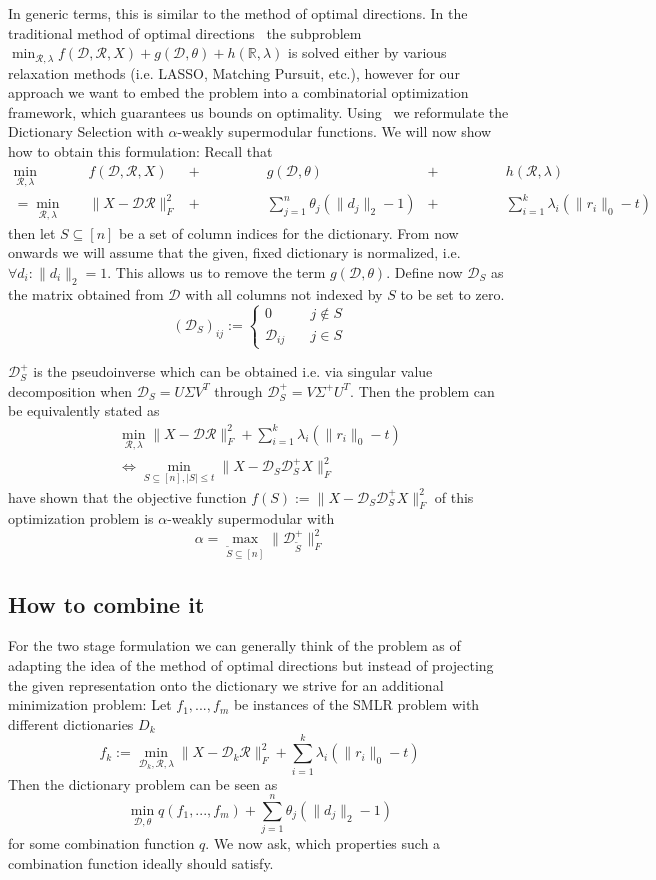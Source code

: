 \documentclass{article}
\newcommand{\R}{\mathbb{R}}
\newcommand{\Rr}{\mathcal{R}}
\newcommand{\D}{\mathcal{D}}
\begin{document}
\noindent In generic terms, this is similar to the method of optimal directions. In the traditional method of optimal directions~\cite{MOD} the subproblem $\min_{\Rr, \lambda} f(\D, \Rr, X) + g(\D, \theta) + h(\R, \lambda)$ is solved either by various relaxation methods (i.e. LASSO, Matching Pursuit, etc.), however for our approach we want to embed the problem into a combinatorial optimization framework, which guarantees us bounds on optimality. Using~\cite{weaklyalpha} we reformulate the Dictionary Selection with $\alpha$-weakly supermodular functions. We will now show how to obtain this formulation:
Recall that
\begin{align*}
\min_{\Rr, \lambda}\quad &f(\D, \Rr, X) &+& \qquad\qquad g(\D, \theta) &+& \qquad\qquad h(\Rr, \lambda) \\
= \min_{\Rr, \lambda}\quad &\|X -\D \Rr\|_F^2 &+& \qquad\qquad\sum_{j=1}^n \theta_j (\| d_j\|_2 - 1) &+& \qquad\qquad\sum_{i=1}^k \lambda_i (\| r_i \|_0 - t)
\end{align*}
then let $S \subseteq [n]$ be a set of column indices for the dictionary. From now onwards we will assume that the given, fixed dictionary is normalized, i.e. $\forall d_i: \|d_i \|_2 = 1$. This allows us to remove the term $g(\D, \theta)$. Define now $\D_S$ as the matrix obtained from $\D$ with all columns not indexed by $S$ to be set to zero.
\[
(\D_S)_{ij} := \begin{cases}
0 \quad &j \notin S \\
\D_{ij} \quad &j\in S
\end{cases}
\]

\noindent$\D_S^+$ is the pseudoinverse which can be obtained i.e. via singular value decomposition when $\D_S = U\Sigma V^T$ through $\D_S^+ = V \Sigma^+ U^T$.
Then the problem can be equivalently stated as
\[
\begin{split}
 \min_{\Rr, \lambda} \|X  -\D \Rr\|_F^2 + \sum_{i=1}^k \lambda_i (\| r_i \|_0 - t)\\
 \Longleftrightarrow 
  \min_{S \subseteq [n], |S| \leq t} \|X  -\D_S\D_S^+ X\|_F^2
 \end{split}
\]
\cite{weaklyalpha} have shown that the objective function $f(S) := \|X  -\D_S\D_S^+ X\|_F^2$ of this optimization problem is $\alpha$-weakly supermodular with 
\[ 
\alpha = \max_{\tilde{S} \subseteq [n]}\| \D_{\tilde{S}}^+ \|_F^2
\]

\subsection{How to combine it}
For the two stage formulation we can generally think of the problem as of adapting the idea of the method of optimal directions but instead of projecting the given representation onto the dictionary we strive for an additional minimization problem:
Let $f_1, ..., f_m$ be instances of the SMLR problem with different dictionaries $D_k$
\[
f_k := \min_{\D_k, \Rr, \lambda} \|X  -\D_k \Rr\|_F^2 + \sum_{i=1}^k \lambda_i (\| r_i \|_0 - t)
\]
 Then the dictionary problem can be seen as
\[
\min_{\D, \theta} q(f_1, ..., f_m) + \sum_{j=1}^n \theta_j (\| d_j\|_2 - 1)
\]
for some combination function $q$. We now ask, which properties such a combination function ideally should satisfy.
\end{document}

